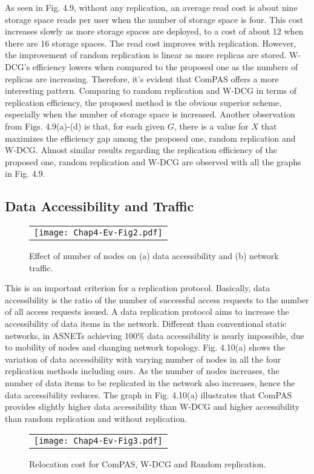 As seen in Fig. 4.9, without any replication, an average read cost is about nine storage space reads per user when the number of storage space is four. This cost increases slowly as more storage spaces are deployed, to a cost of about 12 when there are 16 storage spaces. The read cost improves with replication. However, the improvement of random replication is linear as more replicas are stored. W-DCG's efficiency lowers when compared to the proposed one as the numbers of replicas are increasing. Therefore, it's evident that ComPAS offers a more interesting pattern. Comparing to random replication and W-DCG in terms of replication efficiency, the proposed method is the obvious superior scheme, especially when the number of storage space is increased. Another observation from Figs. 4.9(a)-(d) is that, for each given $G$, there is a value for $X$ that maximizes the efficiency gap among the proposed one, random replication and W-DCG. Almost similar results regarding the replication efficiency of the proposed one, random replication and W-DCG are observed with all the graphs in Fig. 4.9.


\subsection{Data Accessibility and Traffic}\label{Chap4_05_02}
\begin{figure}[h]
\begin{center}
  \begin{tabular}{c}
  \texttt{[image: Chap4-Ev-Fig2.pdf]}
  \end{tabular}
  \caption{Effect of number of nodes on (a) data accessibility and (b) network traffic.}
\end{center}
\end{figure}

This is an important criterion for a replication protocol. Basically, data accessibility is the ratio of the number of successful access requests to the number of all access requests issued. A data replication protocol aims to increase the accessibility of data items in the network. Different than conventional static networks, in ASNETs achieving 100\% data accessibility is nearly impossible, due to mobility of nodes and changing network topology. Fig. 4.10(a) shows the variation of data accessibility with varying number of nodes in all the four replication methods including ours. As the number of nodes increases, the number of data items to be replicated in the network also increases, hence the data accessibility reduces. The graph in Fig. 4.10(a) illustrates that ComPAS provides slightly higher data accessibility than W-DCG and higher accessibility than random replication and without replication.
\begin{figure}[h]
\begin{center}
  \begin{tabular}{c}
  \texttt{[image: Chap4-Ev-Fig3.pdf]}
  \end{tabular}
  \caption{Relocation cost for ComPAS, W-DCG and Random replication.}
\end{center}
\end{figure}

